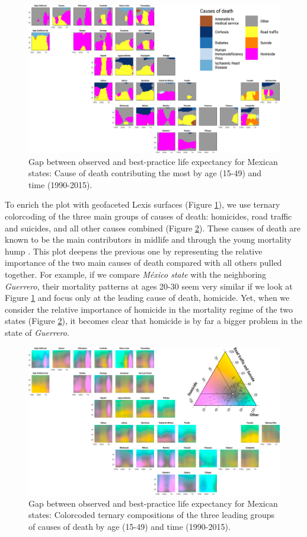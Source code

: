 \documentclass[10pt, twoside, parskip=half]{article}
\begin{document}
\begin{figure}[!t]
\includegraphics[width=1\linewidth]{fig/gg-nine} \caption{Gap between observed and best-practice life expectancy for Mexican states: Cause of death contributing the most by age (15-49) and time (1990-2015).}\label{fig:nine}
\end{figure}

To enrich the plot with geofaceted Lexis surfaces (Figure \ref{fig:nine}), we use ternary colorcoding of the three main groups of causes of death: homicides, road traffic and suicides, and all other causes combined (Figure \ref{fig:tern}). These causes of death are known to be the main contributors in midlife and through the young mortality hump \citep{remund2018d}. This plot deepens the previous one by representing the relative importance of the two main causes of death compared with all others pulled together. For example, if we compare \emph{México state} with the neighboring \emph{Guerrero}, their mortality patterns at ages 20-30 seem very similar if we look at Figure \ref{fig:nine} and focus only at the leading cause of death, homicide. Yet, when we consider the relative importance of homicide in the mortality regime of the two states (Figure \ref{fig:tern}), it becomes clear that homicide is by far a bigger problem in the state of \emph{Guerrero}.



\begin{figure}[!t]
\includegraphics[width=1\linewidth]{fig/gg-tern} \caption{Gap between observed and best-practice life expectancy for Mexican states: Colorcoded ternary compositions of the three leading groups of causes of death by age (15-49) and time (1990-2015).}\label{fig:tern}
\end{figure}
\end{document}
